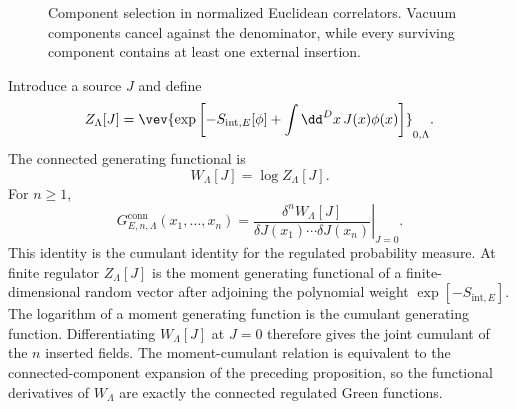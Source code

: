 \begin{figure}[H]
\centering
{}
\caption{Component selection in normalized Euclidean correlators.  Vacuum
components cancel against the denominator, while every surviving component
contains at least one external insertion.}
\label{fig:normalized-correlator-component-selection}
\end{figure}

Introduce a source \(J\) and define
\[
  Z_\Lambda[J]
  =
  \vev{
    \exp\left[
      -S_{\mathrm{int},E}[\phi]
      +\int\dd^D x\,J(x)\phi(x)
    \right]
  }_{0,\Lambda}.
\]
The connected generating functional is
\[
  W_\Lambda[J]=\log Z_\Lambda[J].
\]
For \(n\ge1\),
\[
  G^{\mathrm{conn}}_{E,n,\Lambda}(x_1,\ldots,x_n)
  =
  \left.
  \frac{\delta^n W_\Lambda[J]}{
   \delta J(x_1)\cdots\delta J(x_n)}
  \right|_{J=0}.
\]
This identity is the cumulant identity for the regulated probability measure.
At finite regulator \(Z_\Lambda[J]\) is the moment generating functional of a
finite-dimensional random vector after adjoining the polynomial weight
\(\exp[-S_{\mathrm{int},E}]\).  The logarithm of a moment generating function
is the cumulant generating function.  Differentiating \(W_\Lambda[J]\) at
\(J=0\) therefore gives the joint cumulant of the \(n\) inserted fields.  The
moment-cumulant relation is equivalent to the connected-component expansion of
the preceding proposition, so the functional derivatives of \(W_\Lambda\) are
exactly the connected regulated Green functions.

